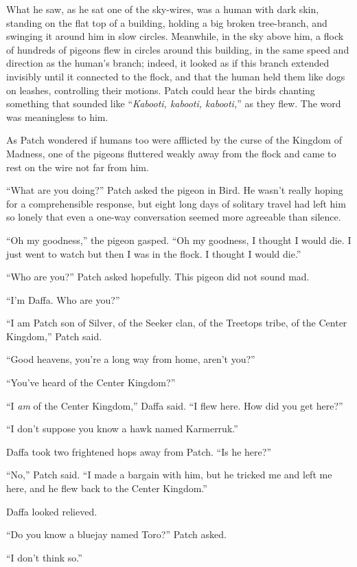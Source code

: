 \documentclass[12pt]{memoir}
\begin{document}
What he saw, as he sat one of the sky-wires, was a human with dark
skin, standing on the flat top of a building, holding a big broken
tree-branch, and swinging it around him in slow circles. Meanwhile, in
the sky above him, a flock of hundreds of pigeons flew in circles
around this building, in the same speed and direction as the human’s
branch; indeed, it looked as if this branch extended invisibly until
it connected to the flock, and that the human held them like dogs on
leashes, controlling their motions. Patch could hear the birds
chanting something that sounded like “\textit{Kabooti, kabooti,
kabooti,}” as they flew. The word was meaningless to him.

As Patch wondered if humans too were afflicted by the curse of the
Kingdom of Madness, one of the pigeons fluttered weakly away from the
flock and came to rest on the wire not far from him.

“What are you doing?” Patch asked the pigeon in Bird. He wasn’t really
hoping for a comprehensible response, but eight long days of solitary
travel had left him so lonely that even a one-way conversation seemed
more agreeable than silence.

“Oh my goodness,” the pigeon gasped. “Oh my goodness, I thought I
would die. I just went to watch but then I was in the flock. I thought
I would die.”

“Who are you?” Patch asked hopefully. This pigeon did not sound mad.

“I’m Daffa. Who are you?”

“I am Patch son of Silver, of the Seeker clan, of the Treetops tribe,
of the Center Kingdom,” Patch said.

“Good heavens, you’re a long way from home, aren’t you?”

“You’ve heard of the Center Kingdom?”

“I \textit{am} of the Center Kingdom,” Daffa said. “I flew here. How
did you get here?”

“I don’t suppose you know a hawk named Karmerruk.”

Daffa took two frightened hops away from Patch. “Is he here?”

“No,” Patch said. “I made a bargain with him, but he tricked me and
left me here, and he flew back to the Center Kingdom.”

Daffa looked relieved.

“Do you know a bluejay named Toro?” Patch asked.

“I don’t think so.”
\end{document}

